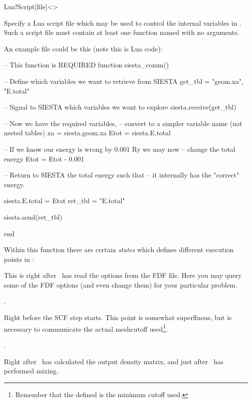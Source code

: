 \begin{fdfentry}{Lua!Script}[file]<>
  
  Specify a Lua script file which may be used to control the internal
  variables in \siesta. Such a script file must contain at least one
  function named  with no arguments.

  An example file could be this (note this is Lua code):
  \begin{codeexample}
-- This function is REQUIRED
function siesta_comm()
   
   -- Define which variables we want to retrieve from SIESTA
   get_tbl = {"geom.xa", "E.total"}

   -- Signal to SIESTA which variables we want to explore
   siesta.receive(get_tbl)

   -- Now we have the required variables,
   -- convert to a simpler variable name (not nested tables)
   xa = siesta.geom.xa
   Etot = siesta.E.total

   -- If we know our energy is wrong by 0.001 Ry we may now
   -- change the total energy
   Etot = Etot - 0.001

   -- Return to SIESTA the total energy such that
   -- it internally has the "correct" energy.

   siesta.E.total = Etot
   ret_tbl = {"E.total"}

   siesta.send(ret_tbl)

end
\end{codeexample}

  Within this function there are certain \emph{states} which defines
  different execution points in \siesta:
  \begin{fdfoptions}

    \option[Initialization]%
    This is right after \siesta\ has read the options from the FDF
    file. Here you may query some of the FDF options (and even change
    them) for your particular problem.

    \note {}.

    \option[Initialize-MD]%
    Right before the SCF step starts. This point is somewhat
    superfluous, but is necessary to communicate the actual meshcutoff
    used\footnote{Remember that the  defined is the
        minimum cutoff used.}.

    \note {}.

    \option[SCF]%
    Right after \siesta\ has calculated the output density matrix, and
    just after \siesta\ has performed mixing.


\end{fdfoptions}
\end{fdfentry}
